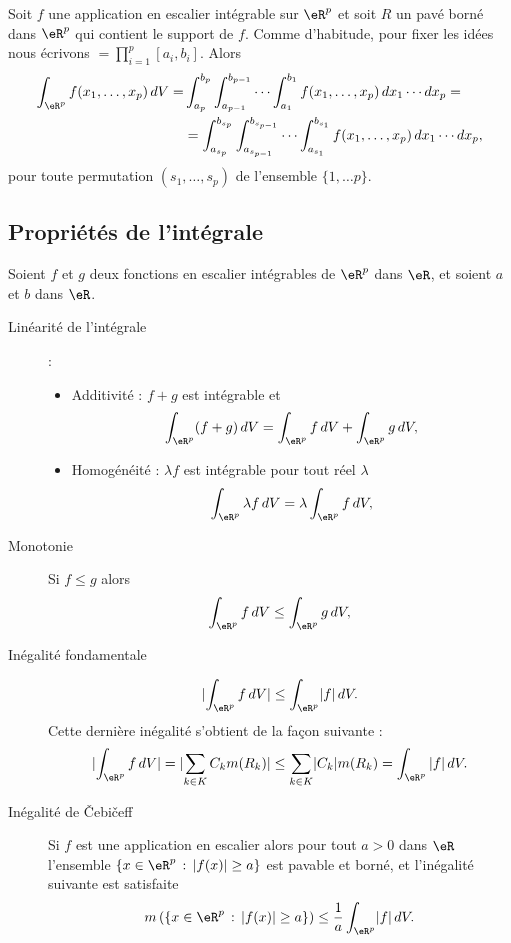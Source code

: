 \begin{proposition}
	Soit \( f\) une application en escalier intégrable sur \( \eR^p\) et soit \( R\) un pavé borné dans \( \eR^p\) qui contient le support de \( f\). Comme d'habitude, pour fixer les idées nous écrivons \( =\prod_{i=1}^p[a_i,b_i]\). Alors
	\begin{equation}
		\begin{aligned}
			\int_{\eR^p}f(x_1,\ldots, x_p) \, dV = & \int_{a_p}^{b_p}\int_{a_{p-1}}^{b_{p-1}}\cdots\int_{a_1}^{b_1} f(x_1,\ldots, x_p) \, dx_1\cdots dx_p=                          \\
			                                       & =\int_{a_{s_p}}^{b_{s_p}}\int_{a_{s_{p-1}}}^{b_{s_{p-1}}}\cdots\int_{a_{s_1}}^{b_{s_1}} f(x_1,\ldots, x_p) \, dx_1\cdots dx_p,
		\end{aligned}
	\end{equation}
	pour toute permutation \( (s_1,\ldots,s_p)\) de l'ensemble \( \{1,\ldots p\}\).
\end{proposition}

\subsection{Propriétés de l'intégrale}

Soient \( f\) et \( g\) deux fonctions en escalier intégrables de \( \eR^p\) dans \( \eR\), et soient \( a\) et \( b\) dans \( \eR\).
\begin{description}
	\item[Linéarité de l'intégrale] :
		\begin{itemize}
			\item Additivité : \( f+g\) est intégrable et
			      \[
				      \int_{\eR^p} (f+g)\, dV = \int_{\eR^p} f\, dV+ \int_{\eR^p} g\, dV,
			      \]
			\item Homogénéité : \( \lambda f\) est intégrable pour tout réel \( \lambda\)
			      \[
				      \int_{\eR^p} \lambda  f\, dV = \lambda\int_{\eR^p} f\, dV,
			      \]
		\end{itemize}
	\item[Monotonie] Si \( f\leq g\) alors
		\[
			\int_{\eR^p} f\, dV\leq \int_{\eR^p} g\, dV,
		\]
	\item[Inégalité fondamentale]
		\[
			\lvert \int_{\eR^p}f\,dV\rvert \leq\int_{\eR^p}\lvert f\rvert\,dV.
		\]
		Cette dernière inégalité s'obtient de la façon suivante :
		\[
			\lvert\int_{\eR^p}f\,dV\rvert =\lvert \sum_{k\in K} C_k m(R_k)\rvert \leq\sum_{k\in K}\lvert C_k\rvert m(R_k)=\int_{\eR^p}|f|\,dV.
		\]
	\item[Inégalité de Čebičeff]  Si \( f\) est une application en escalier alors pour tout \( a>0\) dans \( \eR\) l'ensemble \( \{x\in\eR^p\,:\, |f(x)|\geq a\}\) est pavable et borné, et l'inégalité suivante est satisfaite
		\[
			m\left(\{x\in\eR^p\,:\, |f(x)|\geq a\}\right)\leq \frac{1}{a} \int_{\eR^p}\lvert f\rvert\,dV.
		\]
\end{description}

